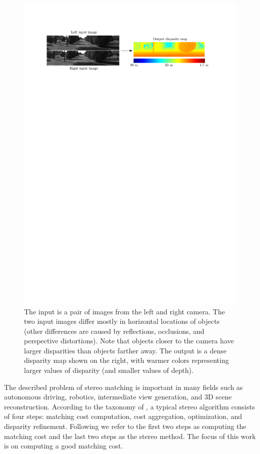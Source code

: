 \documentclass[twoside,11pt]{article}
\begin{document}
\begin{figure}[t]
\begin{center}
\includegraphics[scale=0.95]{img/input_output.pdf}
\end{center}
\caption{The input is a pair of images from the left and right camera. The two
input images differ mostly in horizontal locations of objects (other
differences are caused by reflections, occlusions, and perspective distortions).
Note that objects closer to the camera have larger disparities than objects
farther away. The output is a dense disparity map shown on the right, with
warmer colors representing larger values of disparity (and smaller values of
depth).} 

\label{fig:input_output}
\end{figure}

The described problem of stereo matching is important in many fields such as
autonomous driving, robotics, intermediate view generation, and 3D scene
reconstruction. According to the taxonomy of \citet{scharstein2002taxonomy}, a
typical stereo algorithm consists of four steps: matching cost computation,
cost aggregation, optimization, and disparity refinement. Following
\citet{hirschmuller2009evaluation} we refer to the first two steps as computing
the matching cost and the last two steps as the stereo method. 
The focus of this work is on computing a good matching cost. 
\end{document}

